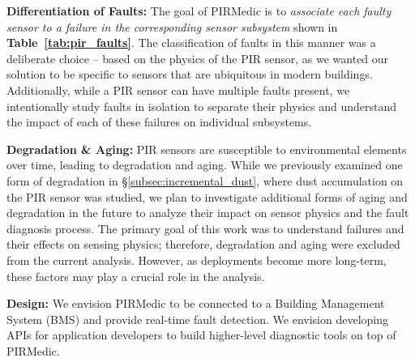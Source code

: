 \documentclass[manuscript]{acmart}
\newcommand{\sol}{{PIRMedic}\xspace}
\begin{document}
\noindent \textbf{Differentiation of Faults:} The goal of \sol is to {\em associate each faulty sensor to a failure in the corresponding sensor subsystem} shown in {\bfseries Table~\ref{tab:pir_faults}}. The classification of faults in this manner was a deliberate choice -- based on the physics of the PIR sensor, as we wanted our solution to be specific to sensors that are ubiquitous in modern buildings. Additionally, while a PIR sensor can have multiple faults present, we intentionally study faults in isolation to separate their physics and understand the impact of each of these failures on individual subsystems.

\noindent \textbf{Degradation \& Aging:} PIR sensors are susceptible to environmental elements over time, leading to degradation and aging. While we previously examined one form of degradation in \S\ref{subsec:incremental_dust}, where dust accumulation on the PIR sensor was studied, we plan to investigate additional forms of aging and degradation in the future to analyze their impact on sensor physics and the fault diagnosis process. The primary goal of this work was to understand failures and their effects on sensing physics; therefore, degradation and aging were excluded from the current analysis. However, as deployments become more long-term, these factors may play a crucial role in the analysis.

\noindent\textbf{Design:} We envision \sol to be connected to a Building Management System (BMS) and provide real-time fault detection. We envision developing APIs for application developers to build higher-level diagnostic tools on top of \sol.
\end{document}
